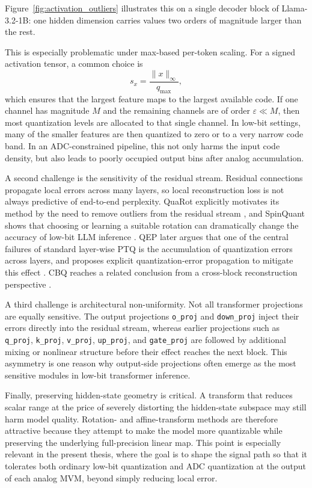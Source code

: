 \documentclass[a4paper,11pt,oneside]{article}
\theoremstyle{breakstyle}
\begin{document}
Figure~\ref{fig:activation_outliers} illustrates this on a single
decoder block of Llama-3.2-1B: one hidden dimension carries values two
orders of magnitude larger than the rest.

This is especially problematic under max-based per-token scaling. For a
signed activation tensor, a common choice is
\begin{equation}
s_x
=
\frac{\|x\|_\infty}{q_{\max}},
\label{eq:per_token_max_scale}
\end{equation}
which ensures that the largest feature maps to the largest available
code. If one channel has magnitude $M$ and the remaining channels are of
order $\varepsilon \ll M$, then most quantization levels are allocated
to that single channel. In low-bit settings, many of the smaller
features are then quantized to zero or to a very narrow code band. In an
ADC-constrained pipeline, this not only harms the input code density,
but also leads to poorly occupied output bins after analog accumulation.

A second challenge is the sensitivity of the residual stream. Residual
connections propagate local errors across many layers, so local
reconstruction loss is not always predictive of end-to-end perplexity.
QuaRot explicitly motivates its method by the need to remove outliers
from the residual stream \cite{QuaRot2024}, and SpinQuant shows that
choosing or learning a suitable rotation can dramatically change the
accuracy of low-bit LLM inference \cite{SpinQuant2024}. QEP later argues
that one of the central failures of standard layer-wise PTQ is the
accumulation of quantization errors across layers, and proposes explicit
quantization-error propagation to mitigate this effect
\cite{QEP2025}. CBQ reaches a related conclusion from a cross-block
reconstruction perspective \cite{CBQ2023}.

A third challenge is architectural non-uniformity. Not all transformer
projections are equally sensitive. The output projections
\texttt{o\_proj} and \texttt{down\_proj} inject their errors directly
into the residual stream, whereas earlier projections such as
\texttt{q\_proj}, \texttt{k\_proj}, \texttt{v\_proj},
\texttt{up\_proj}, and \texttt{gate\_proj} are followed by additional
mixing or nonlinear structure before their effect reaches the next
block. This asymmetry is one reason why output-side projections often
emerge as the most sensitive modules in low-bit transformer inference.

Finally, preserving hidden-state geometry is critical. A transform that
reduces scalar range at the price of severely distorting the hidden-state
subspace may still harm model quality. Rotation- and affine-transform
methods are therefore attractive because they attempt to make the model
more quantizable while preserving the underlying full-precision linear
map. This point is especially relevant in the present thesis, where the
goal is to shape the signal path so
that it tolerates both ordinary low-bit quantization and ADC
quantization at the output of each analog MVM, beyond simply reducing local error.
\end{document}
